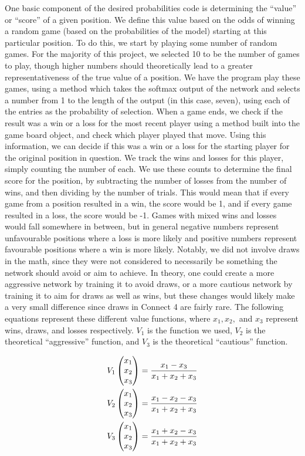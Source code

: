 \documentclass[12pt]{article}
\begin{document}
One basic component of the desired probabilities code is determining the “value” or “score” of a given position. We define this value based on the odds of winning a random game (based on the probabilities of the model) starting at this particular position. To do this, we start by playing some number of random games. For the majority of this project, we selected 10 to be the number of games to play, though higher numbers should theoretically lead to a greater representativeness of the true value of a position. We have the program play these games, using a method which takes the softmax output of the network and selects a number from 1 to the length of the output (in this case, seven), using each of the entries as the probability of selection. When a game ends, we check if the result was a win or a loss for the most recent player using a method built into the game board object, and check which player played that move. Using this information, we can decide if this was a win or a loss for the starting player for the original position in question. We track the wins and losses for this player, simply counting the number of each. We use these counts to determine the final score for the position, by subtracting the number of losses from the number of wins, and then dividing by the number of trials. This would mean that if every game from a position resulted in a win, the score would be 1, and if every game resulted in a loss, the score would be -1. Games with mixed wins and losses would fall somewhere in between, but in general negative numbers represent unfavourable positions where a loss is more likely and positive numbers represent favourable positions where a win is more likely. Notably, we did not involve draws in the math, since they were not considered to necessarily be something the network should avoid or aim to achieve. In theory, one could create a more aggressive network by training it to avoid draws, or a more cautious network by training it to aim for draws as well as wins, but these changes would likely make a very small difference since draws in Connect 4 are fairly rare. The following equations represent these different value functions, where $x_1, x_2,$ and $x_3$ represent wins, draws, and losses respectively. $V_1$ is the function we used, $V_2$ is the theoretical “aggressive” function, and $V_3$ is the theoretical “cautious” function.

\begin{align*}
&V_1\begin{pmatrix}x_1 \\ x_2 \\ x_3\end{pmatrix} = \frac{x_1-x_3}{x_1+x_2+x_3}\\
&V_2\begin{pmatrix}x_1 \\ x_2 \\ x_3\end{pmatrix} = \frac{x_1-x_2-x_3}{x_1+x_2+x_3}\\
&V_3\begin{pmatrix}x_1 \\ x_2 \\ x_3\end{pmatrix} = \frac{x_1+x_2-x_3}{x_1+x_2+x_3}
\end{align*}
\end{document}
